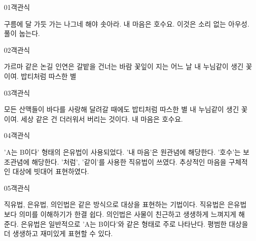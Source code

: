 \documentclass[fs9,seriesFre]{korfarm-base}
\begin{document}

\par\medskip
\kfBeginMC
\begin{kfQBlock}{01}{객관식}
\begin{kfChoices}
\kfChoice 구름에 달 가듯 가는 나그네
\kfChoice 해야 솟아라.
\kfChoice 내 마음은 호수요.
\kfChoice 이것은 소리 없는 아우성.
\kfChoice 풀이 눕는다.
\end{kfChoices}
\end{kfQBlock}
\begin{kfQBlock}{02}{객관식}
\begin{kfChoices}
\kfChoice 가르마 같은 논길
\kfChoice 인연은 갈밭을 건너는 바람
\kfChoice 꽃잎이 지는 어느 날
\kfChoice 내 누님같이 생긴 꽃이여.
\kfChoice 밥티처럼 따스한 별
\end{kfChoices}
\end{kfQBlock}
\begin{kfQBlock}{03}{객관식}
\begin{kfChoices}
\kfChoice 모든 산맥들이 바다를 사랑해 달려갈 때에도
\kfChoice 밥티처럼 따스한 별
\kfChoice 내 누님같이 생긴 꽃이여.
\kfChoice 세상 같은 건 더러워서 버리는 것이다.
\kfChoice 내 마음은 호수요.
\end{kfChoices}
\end{kfQBlock}
\begin{kfQBlock}{04}{객관식}
\begin{kfChoices}
\kfChoice 'A는 B이다' 형태의 은유법이 사용되었다.
\kfChoice '내 마음'은 원관념에 해당한다.
\kfChoice '호수'는 보조관념에 해당한다.
\kfChoice '처럼', '같이'를 사용한 직유법이 쓰였다.
\kfChoice 추상적인 마음을 구체적인 대상에 빗대어 표현하였다.
\end{kfChoices}
\end{kfQBlock}
\begin{kfQBlock}{05}{객관식}
\begin{kfChoices}
\kfChoice 직유법, 은유법, 의인법은 같은 방식으로 대상을 표현하는 기법이다.
\kfChoice 직유법은 은유법보다 의미를 이해하기가 한결 쉽다.
\kfChoice 의인법은 사물이 친근하고 생생하게 느껴지게 해 준다.
\kfChoice 은유법은 일반적으로 'A는 B이다'와 같은 형태로 주로 나타난다.
\kfChoice 평범한 대상을 더 생생하고 재미있게 표현할 수 있다.
\end{kfChoices}
\end{kfQBlock}
\end{document}
